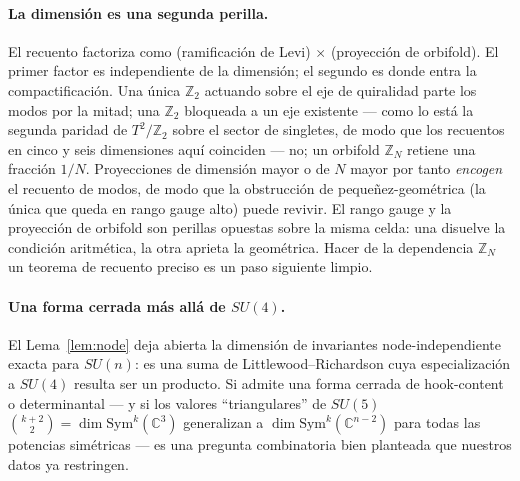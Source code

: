 \documentclass[11pt,a4paper]{article}
\newcommand{\ZZ}{\mathbb{Z}}
\begin{document}
\paragraph{La dimensión es una segunda perilla.} El recuento factoriza como (ramificación de
Levi) $\times$ (proyección de orbifold). El primer factor es independiente de la dimensión; el
segundo es donde entra la compactificación. Una única $\ZZ_2$ actuando sobre el eje de
quiralidad parte los modos por la mitad; una $\ZZ_2$ bloqueada a un eje existente --- como lo
está la segunda paridad de $T^2/\mathbb{Z}_2$ sobre el sector de singletes, de modo que los
recuentos en cinco y seis dimensiones aquí coinciden --- no; un orbifold $\ZZ_N$ retiene una
fracción $1/N$. Proyecciones de dimensión mayor o de $N$ mayor por tanto \emph{encogen} el
recuento de modos, de modo que la obstrucción de pequeñez-geométrica (la única que queda en
rango gauge alto) puede revivir. El rango gauge y la proyección de orbifold son perillas
opuestas sobre la misma celda: una disuelve la condición aritmética, la otra aprieta la
geométrica. Hacer de la dependencia $\ZZ_N$ un teorema de recuento preciso es un paso siguiente
limpio.

\paragraph{Una forma cerrada más allá de $SU(4)$.} El Lema~\ref{lem:node} deja abierta la
dimensión de invariantes node-independiente exacta para $SU(n)$: es una suma de
Littlewood--Richardson cuya especialización a $SU(4)$ resulta ser un producto. Si admite una
forma cerrada de hook-content o determinantal --- y si los valores ``triangulares'' de $SU(5)$
$\binom{k+2}{2}=\dim\mathrm{Sym}^k(\mathbb C^{3})$ generalizan a
$\dim\mathrm{Sym}^k(\mathbb C^{n-2})$ para todas las potencias simétricas --- es una pregunta
combinatoria bien planteada que nuestros datos ya restringen.

\end{document}
